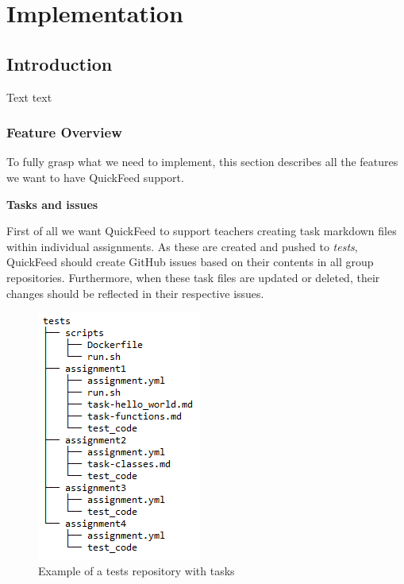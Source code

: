 
\chapter{Implementation}
\label{ch:implementation}

\section{Introduction}

Text text

\subsection{Feature Overview}

To fully grasp what we need to implement, this section describes all the features we want to have QuickFeed support.

\textbf{Tasks and issues}

First of all we want QuickFeed to support teachers creating task markdown files within individual assignments.
As these are created and pushed to \textit{tests}, QuickFeed should create GitHub issues based on their contents in all group repositories.
Furthermore, when these task files are updated or deleted, their changes should be reflected in their respective issues.

\begin{figure}[ht]
    \centering
    \includegraphics[scale=0.8]{photos/tests-repository-structure-tasks.PNG}
    \caption{Example of a tests repository with tasks}
    \label{fig:tests-repository-structure-tasks}
\end{figure}

